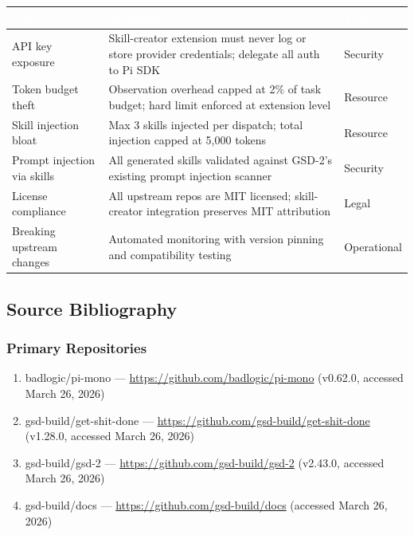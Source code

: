 \documentclass[11pt,letterpaper]{article}
\newcommand{\tableheader}[1]{\textbf{\sffamily\textcolor{white}{#1}}}
\begin{document}
\begin{center}
\begin{tabularx}{\textwidth}{L{3.5cm}XC{2cm}}
\toprule
{}
\tableheader{Concern} & \tableheader{Mitigation} & \tableheader{Type} \\
\midrule
API key exposure & Skill-creator extension must never log or store provider credentials; delegate all auth to Pi SDK & Security \\
Token budget theft & Observation overhead capped at 2\% of task budget; hard limit enforced at extension level & Resource \\
Skill injection bloat & Max 3 skills injected per dispatch; total injection capped at 5,000 tokens & Resource \\
Prompt injection via skills & All generated skills validated against GSD-2's existing prompt injection scanner & Security \\
License compliance & All upstream repos are MIT licensed; skill-creator integration preserves MIT attribution & Legal \\
Breaking upstream changes & Automated monitoring with version pinning and compatibility testing & Operational \\
\bottomrule
\end{tabularx}
\end{center}

\subsection{Source Bibliography}

\subsubsection{Primary Repositories}

\begin{enumerate}[leftmargin=2em]
\item badlogic/pi-mono --- \url{https://github.com/badlogic/pi-mono} (v0.62.0, accessed March 26, 2026)
\item gsd-build/get-shit-done --- \url{https://github.com/gsd-build/get-shit-done} (v1.28.0, accessed March 26, 2026)
\item gsd-build/gsd-2 --- \url{https://github.com/gsd-build/gsd-2} (v2.43.0, accessed March 26, 2026)
\item gsd-build/docs --- \url{https://github.com/gsd-build/docs} (accessed March 26, 2026)
\end{enumerate}
\end{document}

